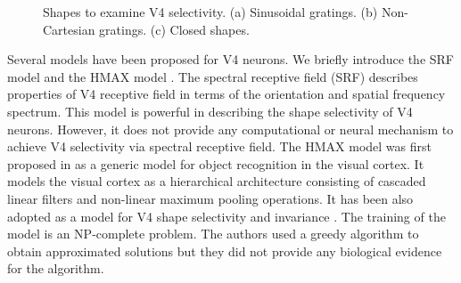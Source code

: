 \documentclass[10pt]{article}
\begin{document}
\begin{figure}
\centering
{}\hfil
{}\hfil
{}
\caption{Shapes to examine V4 selectivity.
(a) Sinusoidal gratings. (b) Non-Cartesian gratings. (c) Closed shapes.}
\label{fig:2}
\end{figure}

Several models have been proposed for V4 neurons.
We briefly introduce the SRF model \cite{david2006} and the HMAX model \cite{riesenhuber1999,cadieu2007}.
The spectral receptive field (SRF) \cite{david2006} describes properties of V4 receptive field in terms of the orientation and spatial frequency spectrum.
This model is powerful in describing the shape selectivity of V4 neurons.
However, it does not provide any computational or neural mechanism to achieve V4 selectivity via spectral receptive field.
The HMAX model was first proposed in \cite{riesenhuber1999} as a generic model for object recognition in the visual cortex.
It models the visual cortex as a hierarchical architecture consisting of cascaded linear filters and non-linear maximum pooling operations.
It has been also adopted as a model for V4 shape selectivity and invariance \cite{cadieu2007}.
The training of the model is an NP-complete problem. 
The authors used a greedy algorithm to obtain approximated solutions but they did not provide any biological evidence for the algorithm. 
\end{document}
